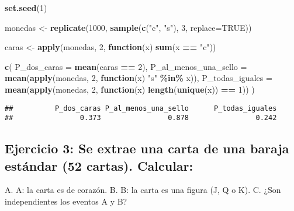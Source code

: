 \documentclass[
]{article}
\newenvironment{Shaded}{\begin{snugshade}}{\end{snugshade}}
\newcommand{\AttributeTok}[1]{\textcolor[rgb]{0.13,0.29,0.53}{#1}}
\newcommand{\ConstantTok}[1]{\textcolor[rgb]{0.56,0.35,0.01}{#1}}
\newcommand{\ControlFlowTok}[1]{\textcolor[rgb]{0.13,0.29,0.53}{\textbf{#1}}}
\newcommand{\DecValTok}[1]{\textcolor[rgb]{0.00,0.00,0.81}{#1}}
\newcommand{\FunctionTok}[1]{\textcolor[rgb]{0.13,0.29,0.53}{\textbf{#1}}}
\newcommand{\NormalTok}[1]{#1}
\newcommand{\OtherTok}[1]{\textcolor[rgb]{0.56,0.35,0.01}{#1}}
\newcommand{\SpecialCharTok}[1]{\textcolor[rgb]{0.81,0.36,0.00}{\textbf{#1}}}
\newcommand{\StringTok}[1]{\textcolor[rgb]{0.31,0.60,0.02}{#1}}
\begin{document}
\begin{Shaded}
\begin{Highlighting}[]
\FunctionTok{set.seed}\NormalTok{(}\DecValTok{1}\NormalTok{)}

\NormalTok{monedas }\OtherTok{\textless{}{-}} \FunctionTok{replicate}\NormalTok{(}\DecValTok{1000}\NormalTok{, }\FunctionTok{sample}\NormalTok{(}\FunctionTok{c}\NormalTok{(}\StringTok{"c"}\NormalTok{, }\StringTok{"s"}\NormalTok{), }\DecValTok{3}\NormalTok{, }\AttributeTok{replace=}\ConstantTok{TRUE}\NormalTok{))}

\NormalTok{caras }\OtherTok{\textless{}{-}} \FunctionTok{apply}\NormalTok{(monedas, }\DecValTok{2}\NormalTok{, }\ControlFlowTok{function}\NormalTok{(x) }\FunctionTok{sum}\NormalTok{(x }\SpecialCharTok{==} \StringTok{"c"}\NormalTok{))}

\FunctionTok{c}\NormalTok{(}
  \AttributeTok{P\_dos\_caras =} \FunctionTok{mean}\NormalTok{(caras }\SpecialCharTok{==} \DecValTok{2}\NormalTok{),}
  \AttributeTok{P\_al\_menos\_una\_sello =} \FunctionTok{mean}\NormalTok{(}\FunctionTok{apply}\NormalTok{(monedas, }\DecValTok{2}\NormalTok{, }\ControlFlowTok{function}\NormalTok{(x) }\StringTok{"s"} \SpecialCharTok{\%in\%}\NormalTok{ x)),}
  \AttributeTok{P\_todas\_iguales =} \FunctionTok{mean}\NormalTok{(}\FunctionTok{apply}\NormalTok{(monedas, }\DecValTok{2}\NormalTok{, }\ControlFlowTok{function}\NormalTok{(x) }\FunctionTok{length}\NormalTok{(}\FunctionTok{unique}\NormalTok{(x)) }\SpecialCharTok{==} \DecValTok{1}\NormalTok{))}
\NormalTok{)}
\end{Highlighting}
\end{Shaded}

\begin{verbatim}
##          P_dos_caras P_al_menos_una_sello      P_todas_iguales 
##                0.373                0.878                0.242
\end{verbatim}

\subsection{Ejercicio 3: Se extrae una carta de una baraja estándar (52
cartas).
Calcular:}\label{ejercicio-3-se-extrae-una-carta-de-una-baraja-estuxe1ndar-52-cartas.-calcular}

A. A: la carta es de corazón. B. B: la carta es una figura (J, Q o K).
C. ¿Son independientes los eventos A y B?
\end{document}
